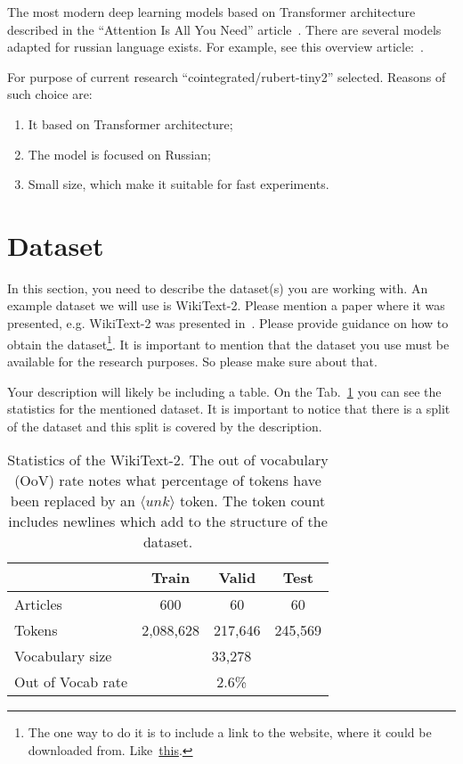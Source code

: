 \documentclass{article}
\begin{document}
The most modern deep learning models based on Transformer architecture described in the ``Attention Is All You Need'' article~\cite{vaswani2023attention}.
There are several models adapted for russian language exists.
For example, see this overview article:~\cite{zmitrovich2024family}.

For purpose of current research ``cointegrated/rubert-tiny2'' selected.
Reasons of such choice are:
\begin{enumerate}
    \item It based on Transformer architecture;
    \item The model is focused on Russian;
    \item Small size, which make it suitable for fast experiments.
\end{enumerate}


\section{Dataset}
In this section, you need to describe the dataset(s) you are working with.
An example dataset we will use is WikiText-2. Please mention a paper where it was presented, e.g. WikiText-2 was presented in~\cite{merity2017pointer}. Please provide guidance on how to obtain the dataset\footnote{The one way to do it is to include a link to the website, where it could be downloaded from. Like~\href{https://blog.einstein.ai/the-wikitext-long-term-dependency-language-modeling-dataset/}{this}.}. It is important to mention that the dataset you use must be available for the research purposes. So please make sure about that.

Your description will likely be including a table. On the Tab.~\ref{tab:statistics} you can see the statistics for the mentioned dataset. It is important to notice that there is a split of the dataset and this split is covered by the description.

\begin{table}[tbh!]
\begin{center}
\begin{tabular}[t]{|l|ccc|}
\hline
 & Train & Valid & Test \\
\hline
Articles & 600 & 60 & 60  \\
Tokens& 2,088,628 & 217,646 & 245,569 \\
Vocabulary size & \multicolumn{3}{c|}{33,278} \\
Out of Vocab rate &  \multicolumn{3}{c|}{2.6\%}  \\
\hline
\end{tabular}
\caption{Statistics of the WikiText-2. The out of vocabulary (OoV) rate notes what percentage of tokens have been replaced by an $\langle unk \rangle$ token. The token count includes newlines which add to the structure of the dataset.}
\label{tab:statistics}
\end{center}
\end{table}
\end{document}
